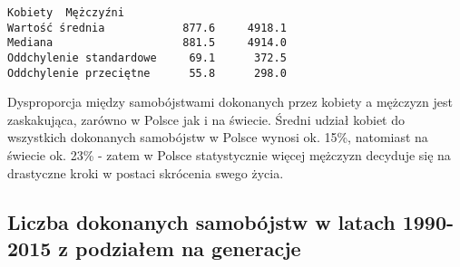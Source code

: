 \documentclass[11pt]{article}
\makeatletter
\newcommand{\boxspacing}{\kern\kvtcb@left@rule\kern\kvtcb@boxsep}
\newcommand{\prompt}[4]{
        {\ttfamily\llap{{\color{#2}[#3]:\hspace{3pt}#4}}\vspace{-\baselineskip}}
    }
\makeatother
\begin{document}
            \begin{tcolorbox}[breakable, size=fbox, boxrule=.5pt, pad at break*=1mm, opacityfill=0]
\prompt{Out}{outcolor}{12}{\boxspacing}
\begin{Verbatim}[commandchars=\\\{\}]
                         Kobiety  Mężczyźni
Wartość średnia            877.6     4918.1
Mediana                    881.5     4914.0
Oddchylenie standardowe     69.1      372.5
Oddchylenie przeciętne      55.8      298.0
\end{Verbatim}
\end{tcolorbox}
        
    Dysproporcja między samobójstwami dokonanych przez kobiety a mężczyzn
jest zaskakująca, zarówno w Polsce jak i na świecie. Średni udział
kobiet do wszystkich dokonanych samobójstw w Polsce wynosi ok. 15\%,
natomiast na świecie ok. 23\% - zatem w Polsce statystycznie więcej
mężczyzn decyduje się na drastyczne kroki w postaci skrócenia swego
życia.

    \hypertarget{liczba-dokonanych-samobuxf3jstw-w-latach-1990-2015-z-podziaux142em-na-generacje}{%
\subsection{Liczba dokonanych samobójstw w latach 1990-2015 z podziałem
na
generacje}\label{liczba-dokonanych-samobuxf3jstw-w-latach-1990-2015-z-podziaux142em-na-generacje}}
\end{document}
